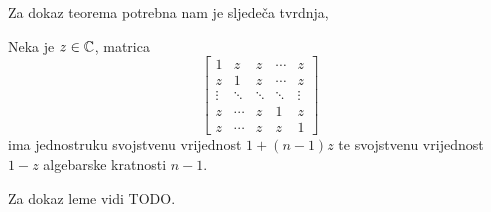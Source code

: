 \documentclass[a4paper,twoside,12pt]{memoir} %
\begin{document}
Za dokaz teorema potrebna nam je sljede\v{c}a tvrdnja,
\begin{lem}\label{lem:5:11}
    Neka je $z \in \mathbb{C}$, matrica 
    \begin{equation*}
        \begin{bmatrix*}
            1 & z & z & \cdots & z \\
            z & 1 & z & \cdots & z \\
            \vdots & \ddots & \ddots & \ddots & \vdots \\ 
            z & \cdots & z & 1 & z \\
            z & \cdots & z & z & 1 
        \end{bmatrix*}
    \end{equation*}
    ima jednostruku svojstvenu vrijednost $1+(n-1)z$ te svojstvenu vrijednost $1-z$ algebarske kratnosti $n-1$.
\end{lem}
\noindentj Za dokaz leme vidi TODO.
\end{document}
